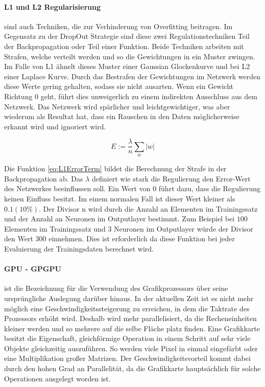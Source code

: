 \paragraph{L1 und L2 Regularisierung} sind auch Techniken, die zur Verhinderung von Overfitting beitragen.
Im Gegensatz zu der DropOut Strategie sind diese zwei Regulationstechniken Teil der Backpropagation oder Teil einer Funktion.
Beide Techniken arbeiten mit Strafen, welche verteilt werden und so die Gewichtungen in ein Muster zwingen. 
Im Falle von L1 ähnelt dieses Muster einer Gaussian Glockenkurve und bei L2 einer Laplace Kurve.
Durch das Bestrafen der Gewichtungen im Netzwerk werden diese Werte gering gehalten, sodass sie nicht ausarten. 
Wenn ein Gewicht Richtung $0$ geht, führt dies unweigerlich zu einem indirekten Ausschluss aus dem Netzwerk.
Das Netzwerk wird spärlicher und leichtgewichtiger, was aber wiederum als Resultat hat, dass ein Rauschen in den Daten möglicherweise erkannt wird und ignoriert wird.

\begin{equation}
	E := \frac{\lambda}{n} \sum\limits_{w}|w|
	\label{eq:L1ErrorTerm}
\end{equation}

Die Funktion \ref{eq:L1ErrorTerm} bildet die Berechnung der Strafe in der Backpropagation ab.
Das $\lambda$ definiert wie stark die Regulierung den Error-Wert des Netzwerkes beeinflussen soll.
Ein Wert von $0$ führt dazu, dass die Regulierung keinen Einfluss besitzt. 
Im einem normalen Fall ist dieser Wert kleiner als $0.1 (10\%)$.
Der Divisor n wird durch die Anzahl an Elementen im Trainingssatz und der Anzahl an Neuronen im Outputlayer bestimmt.
Zum Beispiel bei $100$ Elementen im Trainingssatz und $3$ Neuronen im Outputlayer würde der Divisor den Wert $300$ einnehmen.
Dies ist erforderlich da diese Funktion bei jeder Evaluierung der Trainingsdaten berechnet wird.

\paragraph{GPU - GPGPU} ist die Bezeichnung für die Verwendung des Grafikprozessors über seine ursprüngliche Auslegung darüber hinaus.
In der aktuellen Zeit ist es nicht mehr möglich eine Geschwindigkeitssteigerung zu erreichen, in dem die Taktrate des Prozessors erhöht wird. 
Deshalb wird mehr parallelisiert, da die Recheneinheiten kleiner werden und so mehrere auf die selbe Fläche platz finden. 
Eine Grafikkarte besitzt die Eigenschaft, gleichförmige Operation in einem Schritt auf sehr viele Objekte gleichzeitig auszuführen. 
So werden viele Pixel in einmal eingefärbt oder eine Multiplikation großer Matrizen. 
Der Geschwindigkeitsvorteil kommt dabei durch den hohen Grad an Parallelität, da die Grafikkarte hauptsächlich für solche Operationen ausgelegt worden ist.

